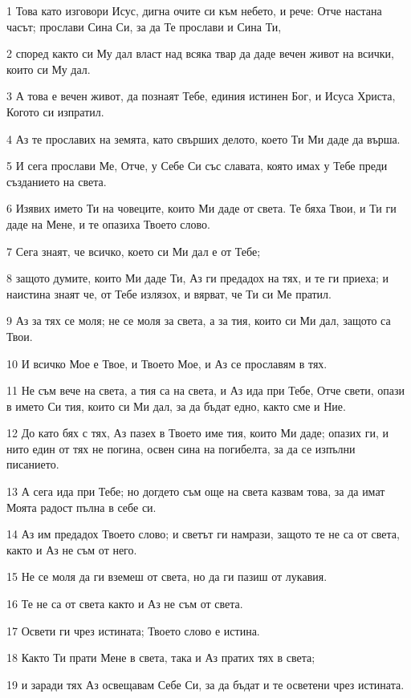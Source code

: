 \par 1 Това като изговори Исус, дигна очите си към небето, и рече: Отче настана часът; прослави Сина Си, за да Те прослави и Сина Ти,
\par 2 според както си Му дал власт над всяка твар да даде вечен живот на всички, които си Му дал.
\par 3 А това е вечен живот, да познаят Тебе, единия истинен Бог, и Исуса Христа, Когото си изпратил.
\par 4 Аз те прославих на земята, като свърших делото, което Ти Ми даде да върша.
\par 5 И сега прослави Ме, Отче, у Себе Си със славата, която имах у Тебе преди създанието на света.
\par 6 Изявих името Ти на човеците, които Ми даде от света. Те бяха Твои, и Ти ги даде на Мене, и те опазиха Твоето слово.
\par 7 Сега знаят, че всичко, което си Ми дал е от Тебе;
\par 8 защото думите, които Ми даде Ти, Аз ги предадох на тях, и те ги приеха; и наистина знаят че, от Тебе излязох, и вярват, че Ти си Ме пратил.
\par 9 Аз за тях се моля; не се моля за света, а за тия, които си Ми дал, защото са Твои.
\par 10 И всичко Мое е Твое, и Твоето Мое, и Аз се прославям в тях.
\par 11 Не съм вече на света, а тия са на света, и Аз ида при Тебе, Отче свети, опази в името Си тия, които си Ми дал, за да бъдат едно, както сме и Ние.
\par 12 До като бях с тях, Аз пазех в Твоето име тия, които Ми даде; опазих ги, и нито един от тях не погина, освен сина на погибелта, за да се изпълни писанието.
\par 13 А сега ида при Тебе; но догдето съм още на света казвам това, за да имат Моята радост пълна в себе си.
\par 14 Аз им предадох Твоето слово; и светът ги намрази, защото те не са от света, както и Аз не съм от него.
\par 15 Не се моля да ги вземеш от света, но да ги пазиш от лукавия.
\par 16 Те не са от света както и Аз не съм от света.
\par 17 Освети ги чрез истината; Твоето слово е истина.
\par 18 Както Ти прати Мене в света, така и Аз пратих тях в света;
\par 19 и заради тях Аз освещавам Себе Си, за да бъдат и те осветени чрез истината.
